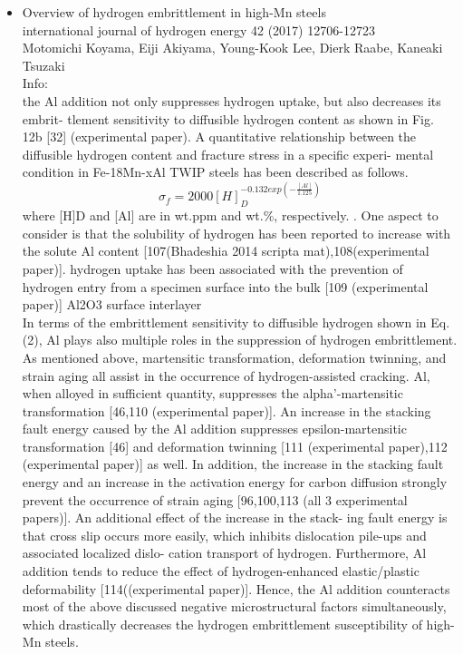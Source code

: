 \documentclass[11pt,floatfix,showpacs]{amsart}
\newcommand{\fr}[2]{{\frac{#1}{#2}}}
\begin{document}
\begin{itemize}
\item Overview of hydrogen embrittlement in high-Mn steels\\
international journal of hydrogen energy 42 (2017) 12706-12723\\
Motomichi Koyama, Eiji Akiyama, Young-Kook Lee, Dierk Raabe, Kaneaki Tsuzaki\\
Info:\\
the Al addition not only suppresses hydrogen uptake, but also decreases its embrit- tlement sensitivity to diffusible hydrogen content as shown in Fig. 12b [32] (experimental paper). A quantitative relationship between the diffusible hydrogen content and fracture stress in a specific experi- mental condition in Fe-18Mn-xAl TWIP steels has been described as follows.
\[
\sigma_f = 2000[H]_D ^{-0.132 exp(-\fr{[Al]}{1.125})}
\]
where [H]D and [Al] are in wt.ppm and wt.\%, respectively. .
One aspect to consider is that the solubility of hydrogen has been reported to increase with the solute Al content [107(Bhadeshia 2014 scripta mat),108(experimental paper)].
hydrogen uptake has been associated with the prevention of hydrogen entry from a specimen surface into the bulk [109 (experimental paper)] 
Al2O3 surface interlayer\\
In terms of the embrittlement sensitivity to diffusible hydrogen shown in Eq. (2), Al plays also multiple roles in the suppression of hydrogen embrittlement. As mentioned above, martensitic transformation, deformation twinning, and strain aging all assist in the occurrence of hydrogen-assisted cracking. Al, when alloyed in sufficient quantity, suppresses the alpha'-martensitic transformation [46,110 (experimental paper)]. An increase in the stacking fault energy caused by the Al addition suppresses epsilon-martensitic transformation [46] and deformation twinning [111 (experimental paper),112 (experimental paper)] as well. In addition, the increase in the stacking fault energy and an increase in the activation energy for carbon diffusion strongly prevent the occurrence of strain aging [96,100,113 (all 3 experimental papers)]. An additional effect of the increase in the stack- ing fault energy is that cross slip occurs more easily, which inhibits dislocation pile-ups and associated localized dislo- cation transport of hydrogen. Furthermore, Al addition tends to reduce the effect of hydrogen-enhanced elastic/plastic deformability [114((experimental paper)]. Hence, the Al addition counteracts most of the above discussed negative microstructural factors simultaneously, which drastically decreases the hydrogen embrittlement susceptibility of high-Mn steels.




\end{itemize}
\end{document}
